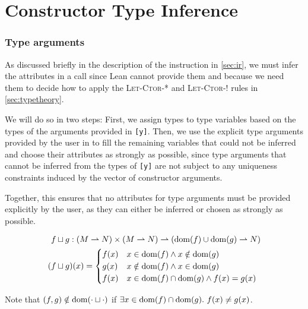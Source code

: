 \section{Constructor Type Inference}\label{sec:ctorinference}
\subsubsection{Type arguments}
As discussed briefly in the description of the  instruction in \cref{sec:ir}, we must infer the attributes in a  call since Lean cannot provide them and because we need them to decide how to apply the \textsc{Let-Ctor-*} and \textsc{Let-Ctor-!} rules in \cref{sec:typetheory}. 

We will do so in two steps: First, we assign types to type variables based on the types of the arguments provided in \texttt{[y]}. Then, we use the explicit type arguments provided by the user in \icode{[τ?]} to fill the remaining variables that could not be inferred and choose their attributes as strongly as possible, since type arguments that cannot be inferred from the types of \texttt{[y]} are not subject to any uniqueness constraints induced by the vector of constructor arguments. 

Together, this ensures that no attributes for type arguments must be provided explicitly by the user, as they can either be inferred or chosen as strongly as possible.

\begin{alignat*}{3}
	f &\sqcup g : (M \rightharpoonup N) \times (M \rightharpoonup N) \rightharpoonup (\mathrm{dom}(f) \cup \mathrm{dom}(g) \rightharpoonup N) \\
	(f &\sqcup g)(x) = \begin{cases}
		f(x) & x \in \mathrm{dom}(f) \land x \notin \mathrm{dom}(g) \\
		g(x) & x \notin \mathrm{dom}(f) \land x \in \mathrm{dom}(g) \\
		f(x) & x \in \mathrm{dom}(f) \cap \mathrm{dom}(g) \land f(x) = g(x)
	\end{cases}
\end{alignat*}

Note that $(f, g) \notin \mathrm{dom}(\cdot \sqcup \cdot)$ if $\exists x \in \mathrm{dom}(f) \cap \mathrm{dom}(g).\ f(x) \neq g(x)$.

\newcommand{\inferVarsDash}{\mathrm{inferVars'}}

